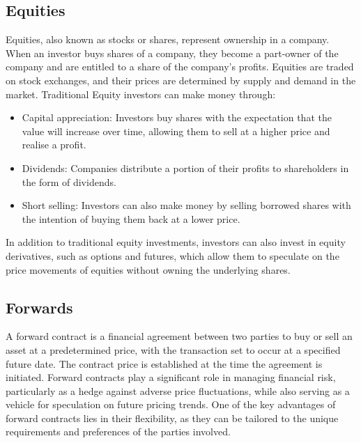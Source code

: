     \subsection{Equities}
        \label{sec:equities}

        Equities, also known as stocks or shares, represent ownership in a company.
        When an investor buys shares of a company,
        they become a part-owner of the company and are entitled to a share of the company's profits.
        Equities are traded on stock exchanges, and their prices are determined by supply and demand in the market.
        Traditional Equity investors can make money through:

        \begin{itemize}
            \item Capital appreciation: Investors buy shares with the expectation that the value will increase over time,
                allowing them to sell at a higher price and realise a profit.
            \item Dividends: Companies distribute a portion of their profits to shareholders in the form of dividends.
            \item Short selling: Investors can also make money by selling borrowed shares with the intention of buying
                them back at a lower price.
            \label{item:equity_investing}
        \end{itemize}

        In addition to traditional equity investments,
        investors can also invest in equity derivatives, such as options and futures,
        which allow them to speculate on the price movements of equities without owning the underlying shares.

    \subsection{Forwards}
        \label{sec:forwards}

        A forward contract is a financial agreement between two parties to buy or sell an asset at a predetermined price,
        with the transaction set to occur at a specified future date.
        The contract price is established at the time the agreement is initiated.
        Forward contracts play a significant role in managing financial risk,
        particularly as a hedge against adverse price fluctuations,
        while also serving as a vehicle for speculation on future pricing trends.
        One of the key advantages of forward contracts lies in their flexibility,
        as they can be tailored to the unique requirements and preferences of the parties involved.

